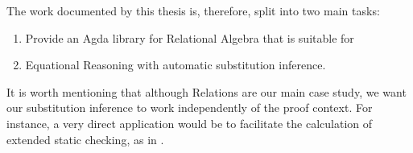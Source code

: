 The work documented by this thesis is, therefore, split into two main tasks:
\begin{enumerate} %
  \item Provide an Agda library for Relational Algebra that is suitable for
  \item Equational Reasoning with automatic substitution inference.
\end{enumerate}

It is worth mentioning that although Relations are our main case study, we want
our substitution inference to work independently of the proof context. For instance,
a very direct application would be to facilitate the calculation of extended static
checking, as in \cite{JNO2009}.





